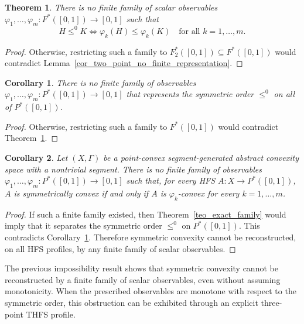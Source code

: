 \documentclass[11pt,a4paper]{article}
\newtheorem{theorem}{Theorem}
\newtheorem{corollary}{Corollary}
\begin{document}
\begin{theorem}\label{teo_no_global}
There is no finite family of scalar observables \(\varphi_1,\dots,\varphi_m:F^*([0,1])\to[0,1]\) such that
\[
H\leq^0 K
\Longleftrightarrow
\varphi_k(H)\leq \varphi_k(K)
\quad\text{for all }k=1,\dots,m.
\]
\end{theorem}

\begin{proof}
Otherwise, restricting such a family to \(F^*_2([0,1])\subseteq F^*([0,1])\) would contradict Lemma~\ref{cor_two_point_no_finite_representation}. 
\end{proof}

\begin{corollary}\label{corolario_no_global}
There is no finite family of observables \(\varphi_1,\dots,\varphi_m:P^*([0,1])\to[0,1]\) that represents the symmetric order \(\leq^0\) on all of \(P^*([0,1])\).
\end{corollary}

\begin{proof}
Otherwise, restricting such a family to \(F^*([0,1])\) would contradict Theorem~\ref{teo_no_global}.
\end{proof}

\begin{corollary}\label{corolario_no_scalar_convexity_reconstruction}
Let \((X,\Gamma)\) be a point-convex segment-generated abstract convexity space with a nontrivial segment. There is no finite family of observables \(\varphi_1,\dots,\varphi_m:P^*([0,1])\to[0,1]\) such that, for every HFS \(A:X\to P^*([0,1])\), \(A\) is symmetrically convex if and only if \(A\) is \(\varphi_k\)-convex for every \(k=1,\dots,m\).
\end{corollary}

\begin{proof}
If such a finite family existed, then Theorem~\ref{teo_exact_family} would imply that it separates the symmetric order \(\leq^0\) on \(P^*([0,1])\). This contradicts Corollary~\ref{corolario_no_global}. Therefore symmetric convexity cannot be reconstructed, on all HFS profiles, by any finite family of scalar observables.
\end{proof}



The previous impossibility result shows that symmetric convexity cannot be reconstructed by a finite family of scalar observables, even without assuming monotonicity. When the prescribed observables are monotone with respect to the symmetric order, this obstruction can be exhibited through an explicit three-point THFS profile.
\end{document}

